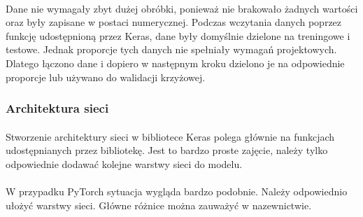 \documentclass[a4paper,11pt]{article}
\begin{document}
\paragraph{}Dane nie wymagały zbyt dużej obróbki, ponieważ nie brakowało żadnych wartości oraz były zapisane w postaci numerycznej. Podczas wczytania danych poprzez funkcję udostępnioną przez Keras, dane były domyślnie dzielone na treningowe i testowe. Jednak proporcje tych danych nie spełniały wymagań projektowych. Dlatego łączono dane i dopiero w następnym kroku dzielono je na odpowiednie proporcje lub używano do walidacji krzyżowej.
\subsubsection{Architektura sieci}
\paragraph{}Stworzenie architektury sieci w bibliotece Keras polega głównie na funkcjach udostępnianych przez bibliotekę. Jest to bardzo proste zajęcie, należy tylko odpowiednie dodawać kolejne warstwy sieci do modelu.
\paragraph{}W przypadku PyTorch sytuacja wygląda bardzo podobnie. Należy odpowiednio ułożyć warstwy sieci. Główne różnice można zauważyć w nazewnictwie.
\end{document}
